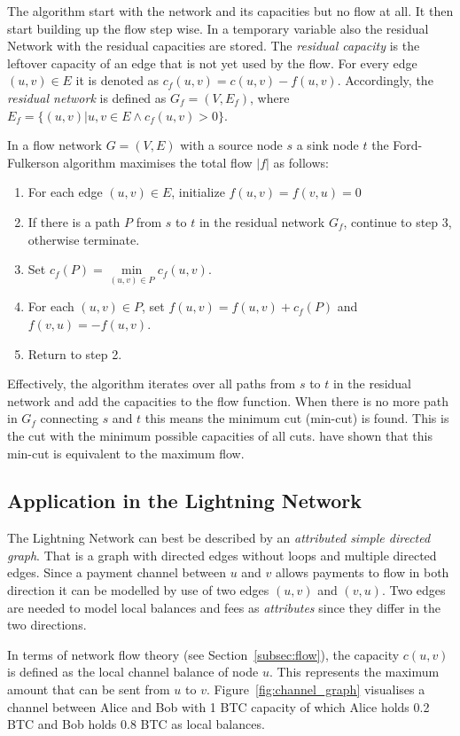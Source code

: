 \documentclass[final]{fhnwreport}       %
\begin{document}
The algorithm start with the network and its capacities but no flow at all. It then start building up the flow step wise. In a temporary variable also the residual Network with the residual capacities are stored. The \emph{residual capacity} is the leftover capacity of an edge that is not yet used by the flow. For every edge $(u,v) \in E$ it is denoted as $c_f(u,v) = c(u,v)-f(u,v)$. Accordingly, the \emph{residual network} is defined as $G_f = (V, E_f)$, where $E_f=\{(u,v) | u, v \in  E \land c_f(u,v)>0\}$.

In a flow network $G = (V, E)$ with a source node $s$ a sink node $t$ the Ford-Fulkerson algorithm maximises the total flow $|f|$ as follows:

\begin{enumerate}
  \item For each edge $(u,v) \in E$, initialize $f(u, v)=f(v, u) = 0$
  \item If there is a path $P$ from $s$ to $t$ in the residual network $G_f$, continue to step 3, otherwise terminate.
  \item Set $c_f(P) = \min\limits_{(u,v) \in P} c_f(u, v)$.
  \item For each $(u,v) \in P$, set $f(u,v) = f(u, v) + c_f(P)$ and $f(v,u) = -f(u,v)$.
  \item Return to step 2.
\end{enumerate}

Effectively, the algorithm iterates over all paths from $s$ to $t$ in the residual network and add the capacities to the flow function. When there is no more path in $G_f$ connecting $s$ and $t$ this means the minimum cut (min-cut) is found. This is the cut with the minimum possible capacities of all cuts. \textcite{ford_maximal_1956} have shown that this min-cut is equivalent to the maximum flow. 

\subsection{Application in the Lightning Network}
The Lightning Network can best be described by an \emph{attributed simple directed graph}. That is a graph with directed edges without loops and multiple directed edges. Since a payment channel between $u$ and $v$ allows payments to flow in both direction it can be modelled by use of two edges $(u, v)$ and $(v, u)$. Two edges are needed to model local balances and fees as \emph{attributes} since they differ in the two directions.

In terms of network flow theory (see Section~\ref{subsec:flow}), the capacity $c(u,v)$ is defined as the local channel balance of node $u$. This represents the maximum amount that can be sent from $u$ to $v$. Figure~\ref{fig:channel_graph} visualises a channel between Alice and Bob with 1 BTC capacity of which Alice holds 0.2 BTC and Bob holds 0.8 BTC as local balances. 
\end{document}
